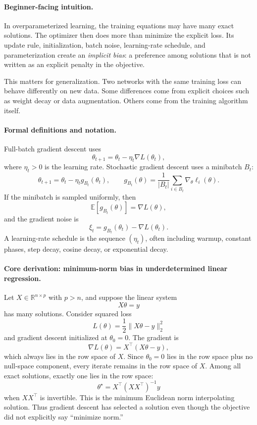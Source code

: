 \paragraph{Beginner-facing intuition.}
In overparameterized learning, the training equations may have many exact solutions. The optimizer then does more than minimize the explicit loss. Its update rule, initialization, batch noise, learning-rate schedule, and parameterization create an \emph{implicit bias}: a preference among solutions that is not written as an explicit penalty in the objective.

This matters for generalization. Two networks with the same training loss can behave differently on new data. Some differences come from explicit choices such as weight decay or data augmentation. Others come from the training algorithm itself.

\paragraph{Formal definitions and notation.}
Full-batch gradient descent uses
\[
\theta_{t+1}=\theta_t-\eta_t\nabla L(\theta_t),
\]
where \(\eta_t>0\) is the learning rate. Stochastic gradient descent uses a minibatch \(B_t\):
\[
\theta_{t+1}=\theta_t-\eta_t g_{B_t}(\theta_t),
\qquad
g_{B_t}(\theta)=\frac{1}{|B_t|}\sum_{i\in B_t}\nabla_\theta \ell_i(\theta).
\]
If the minibatch is sampled uniformly, then
\[
\mathbb{E}[g_{B_t}(\theta)]=\nabla L(\theta),
\]
and the gradient noise is
\[
\xi_t=g_{B_t}(\theta_t)-\nabla L(\theta_t).
\]
A learning-rate schedule is the sequence \((\eta_t)\), often including warmup, constant phases, step decay, cosine decay, or exponential decay.

\paragraph{Core derivation: minimum-norm bias in underdetermined linear regression.}
Let \(X\in\mathbb{R}^{n\times p}\) with \(p>n\), and suppose the linear system
\[
X\theta=y
\]
has many solutions. Consider squared loss
\[
L(\theta)=\frac12\|X\theta-y\|_2^2
\]
and gradient descent initialized at \(\theta_0=0\). The gradient is
\[
\nabla L(\theta)=X^\top(X\theta-y),
\]
which always lies in the row space of \(X\). Since \(\theta_0=0\) lies in the row space plus no null-space component, every iterate remains in the row space of \(X\). Among all exact solutions, exactly one lies in the row space:
\[
\boxed{\theta^\star=X^\top(XX^\top)^{-1}y}
\]
when \(XX^\top\) is invertible. This is the minimum Euclidean norm interpolating solution. Thus gradient descent has selected a solution even though the objective did not explicitly say ``minimize norm.''

